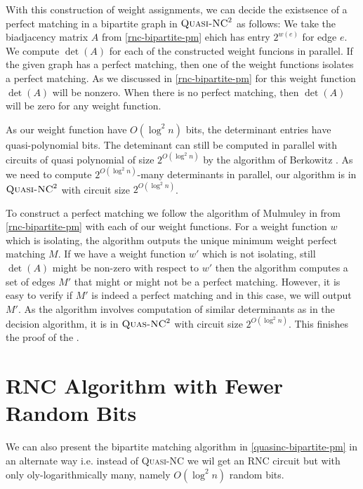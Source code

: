 With this construction of weight assignments, we can decide the existsence of a perfect matching in a bipartite graph in $\textsc{Quasi-NC}^2$ as follows: We take the biadjacency matrix $A$ from \autoref{rnc-bipartite-pm} ehich has entry $2^{w(e)}$ for edge $e$. We compute $\det(A)$ for each of the constructed weight funcions in parallel. If the given graph has a perfect matching, then one of the weight functions isolates a perfect matching. As we discussed in \autoref{rnc-bipartite-pm} for this weight function $\det(A)$ will be nonzero. When there is no perfect matching, then $\det(A)$ will be zero for any weight function.

As our weight function have $O(\log^2n)$ bits, the determinant entries have quasi-polynomial bits. The deteminant can still be computed in parallel with circuits of quasi polynomial of size $2^{O(\log^2 n)}$ by the algorithm of Berkowitz \cite{Berkowitz_1984_Oct}. As we need to compute $2^{O(\log^2n)}$-many determinants in parallel, our algorithm is in $\textsc{Quasi-NC}^2$ with circuit size $2^{O(\log^2 n)}$.

To construct a perfect matching we follow the algorithm of Mulmuley in \cite{MulmuleyVaziraniVazirani_1987_Mia_CONF} from \autoref{rnc-bipartite-pm} with each of our weight functions. For a weight function $w$ which is isolating, the algorithm outputs the unique minimum weight perfect matching $M$. If we have a weight function $w'$ which is not isolating, still $\det (A)$ might be non-zero  with respect to $w'$ then the algorithm computes a set of edges $M'$ that might or might not be a perfect matching. However, it is easy to verify if $M'$ is indeed a perfect matching and in this case, we will output $M'$. As the algorithm involves computation of similar determinants as in the decision algorithm, it is in $\textsc{Quas-NC}^2$ with circuit size $2^{O(\log ^2 n)}$. This finishes the proof of the .


\section{\textsc{RNC} Algorithm with Fewer Random Bits}
We can also present the bipartite matching algorithm in \autoref{quasinc-bipartite-pm} in an alternate way i.e. instead of \textsc{Quasi-NC} we wil get an \textsc{RNC} circuit but with only oly-logarithmically many, namely $O(\log^2 n)$ random bits. 


